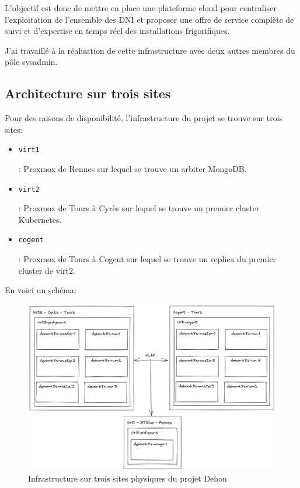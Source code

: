 \documentclass[12pt, a4paper, twoside]{article}
\begin{document}
L'objectif est donc de mettre en place une plateforme cloud pour centraliser l'exploitation de l'ensemble des \gls{DNI} et proposer une offre de service complète de suivi et d'expertise en temps réel des installations frigorifiques.

J'ai travaillé à la réalisation de cette infrastructure avec deux autres membres du pôle sysadmin.

\subsection{Architecture sur trois sites}
Pour des raisons de disponibilité, l'infrastructure du projet se trouve sur trois sites:
\begin{itemize}
    \item \begin{code}\texttt{virt1}\end{code}: \gls{Proxmox} de Rennes sur lequel se trouve un arbiter MongoDB. 
    \item \begin{code}\texttt{virt2}\end{code}: \gls{Proxmox} de Tours à Cyrès sur lequel se trouve un premier \gls{cluster} \gls{Kubernetes}.
    \item \begin{code}\texttt{cogent}\end{code}: \gls{Proxmox} de Tours à Cogent sur lequel se trouve un replica du premier \gls{cluster} de virt2.
\end{itemize}

\newpage
En voici un schéma:
\begin{figure}[!ht]
    \centering
        \includegraphics[width=\textwidth]{src/graph_dehon1.png}
    \caption{Infrastructure sur trois sites physiques du projet Dehon}
    \label{fig:graph_dehon1}
\end{figure}
\end{document}
